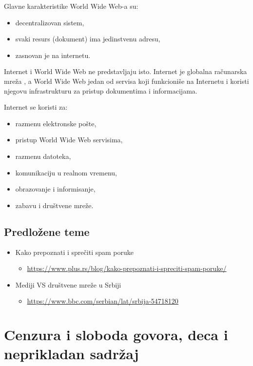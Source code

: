 \documentclass[a4paper, 12pt]{article}
\begin{document}
Glavne karakteristike World Wide Web-a su:
\begin{itemize}
    \item decentralizovan sistem,
    \item svaki resurs (dokument) ima jedinstvenu adresu,
    \item zasnovan je na internetu.
\end{itemize}

Internet i World Wide Web ne predstavljaju isto. Internet je globalna računarska mreža
, a World Wide Web jedan od servisa koji funkcioniše na Internetu i koristi njegovu
infrastrukturu za pristup dokumentima i informacijama.

Internet se koristi za:
\begin{itemize}
    \item razmenu elektronske pošte,
    \item pristup World Wide Web servisima,
    \item razmenu datoteka,
    \item komunikaciju u realnom vremenu,
    \item obrazovanje i informisanje,
    \item zabavu i društvene mreže.
\end{itemize}
\subsection{Predložene teme}

\begin{itemize}
    \item Kako prepoznati i sprečiti spam poruke
    \begin{itemize}
        \item \url{https://www.plus.rs/blog/kako-prepoznati-i-spreciti-spam-poruke/}
    \end{itemize}
    \item Mediji VS društvene mreže u Srbiji
    \begin{itemize}
        \item \url{https://www.bbc.com/serbian/lat/srbija-54718120}
    \end{itemize}
    
\end{itemize}


\section{Cenzura i sloboda govora, deca i neprikladan sadržaj}
\end{document}
